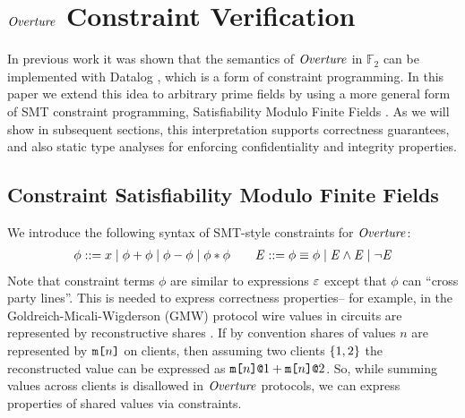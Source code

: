 \section{$\mathit{Overture}$ Constraint Verification}
\label{section-smt}

In previous work it was shown that the semantics of $\mathit{Overture}$ in
$\mathbb{F}_2$ can be implemented with Datalog
\cite{skalka-near-ppdp24}, which is a form of constraint
programming. In this paper we extend this idea to arbitrary prime
fields by using a more general form of SMT constraint programming,
Satisfiability Modulo Finite Fields \cite{SMFF}. As we
will show in subsequent sections, this interpretation supports
correctness guarantees, and also static type analyses for enforcing
confidentiality and integrity properties.

\subsection{Constraint Satisfiability Modulo Finite Fields}

We introduce the following syntax of SMT-style constraints
for $\mathit{Overture}$:
$$
\begin{array}{rcl}
  \phi ::= x \mid \phi + \phi \mid \phi - \phi \mid \phi * \phi  \qquad
  \mathit{E} ::= \phi \equiv \phi \mid \mathit{E} \wedge \mathit{E} \mid \neg\mathit{E}
\end{array}
$$
%
Note that constraint terms $\phi$ are similar to expressions $\varepsilon$
except that $\phi$ can ``cross party lines''. This is needed
to express correctness properties-- for example, in the
Goldreich-Micali-Wigderson (GMW) protocol wire values in circuits are
represented by reconstructive shares \cite{evans2018pragmatic}.  If by
convention shares of values $n$ are represented by $\texttt{m[}n\texttt{]}$ on
clients, then assuming two clients $\{ 1,2 \}$ the reconstructed
value can be expressed as $\texttt{m[}n\texttt{]}\texttt{@}1 + \texttt{m[}n\texttt{]}\texttt{@}2$.  So, while summing
values across clients is disallowed in $\mathit{Overture}$ protocols, we can
express properties of shared values via constraints.

%
%  
%  

